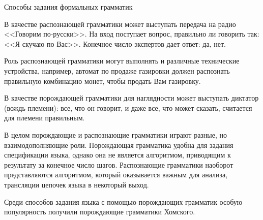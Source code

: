 \documentclass[12pt, pdf, hyperref={unicode},handout]{beamer}
\begin{document}
\begin{frame}{Способы задания формальных грамматик}
  \begin{block}

    \small{
      В качестве распознающей грамматики может выступать передача на радио <<Говорим по-русски>>. На вход поступает вопрос, правильно ли говорить так: <<Я скучаю по Вас>>. Конечное число экспертов дает ответ: да, нет.

      Роль распознающей грамматики могут выполнять и различные технические устройства, например, автомат по продаже газировки должен распознать правильную комбинацию монет, чтобы продать Вам газировку.
      
      В качестве порождающей грамматики для наглядности может выступать диктатор (вождь племени): все, что он говорит, и даже все, что может сказать, считается для племени правильным.

      В целом порождающие и распознающие грамматики играют разные, но взаимодополняющие роли. Порождающая грамматика удобна для задания спецификации языка, однако она не является алгоритмом, приводящим к результату за конечное число шагов. Распознающие грамматики наоборот представляются алгоритмом, который оказывается важным для анализа, трансляции цепочек языка в некоторый выход.

      Среди способов задания языка с помощью порождающих грамматик особую популярность получили порождающие грамматики Хомского.
      
      }

  \end{block}
  
\end{frame}
\end{document}
